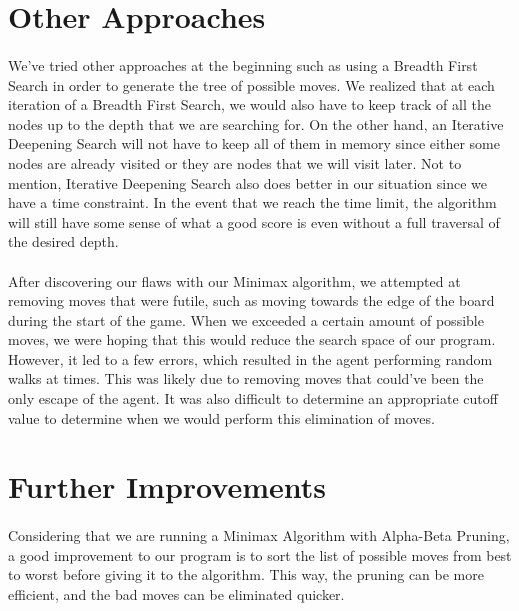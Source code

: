 \documentclass[12pt,a4paper]{article}
\begin{document}
\section{Other Approaches}
\paragraph{} We've tried other approaches at the beginning such as using a Breadth First Search in order to generate the 
tree of possible moves. We realized that at each iteration of a Breadth First Search, 
we would also have to keep track of 
all the nodes up to the depth that we are searching for. On the other hand, an Iterative Deepening Search will not 
have to keep all of them in memory since either some nodes are already visited or they are nodes that we will 
visit later. Not to mention, Iterative Deepening Search also does better in our situation since we have a time 
constraint. In the event that we reach the time limit, the algorithm will still 
have some sense of what a good score is even without 
a full traversal of the desired depth. 
\paragraph{} After discovering our flaws with our Minimax algorithm, we attempted at removing moves that were futile, 
such as moving towards the edge of the board during the start of the game. 
When we exceeded a certain amount of possible moves, we were hoping that this would reduce the 
search space of our program. However, it led to a few errors, which resulted in the agent performing random walks at 
times. 
This was likely due to removing moves that could've been the only escape of the agent. It was also difficult to 
determine an appropriate cutoff value to determine when we would perform this elimination 
of moves. 


\section{Further Improvements}
\paragraph{} Considering that we are running a Minimax Algorithm with Alpha-Beta Pruning, a good improvement to our 
program is to sort the list of possible moves from best to worst before giving it to the algorithm. 
This way, the pruning can 
be more efficient, and the bad moves can be eliminated quicker. 
\end{document}
